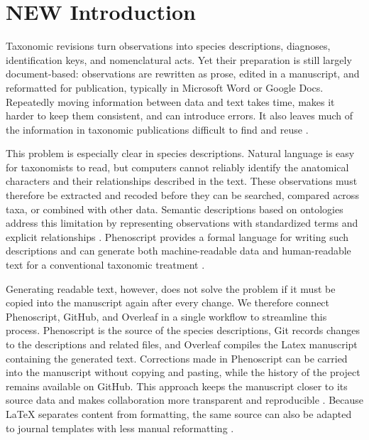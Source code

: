 

\section*{NEW Introduction}

Taxonomic revisions turn observations into species descriptions, diagnoses, identification keys, and nomenclatural acts. Yet their preparation is still largely document-based: observations are rewritten as prose, edited in a manuscript, and reformatted for publication, typically in Microsoft Word or Google Docs. Repeatedly moving information between data and text takes time, makes it harder to keep them consistent, and can introduce errors. It also leaves much of the information in taxonomic publications difficult to find and reuse \citep{smith2013beyond, miller2012cybertaxonomic, penev2017strategies}.

This problem is especially clear in species descriptions. Natural language is easy for taxonomists to read, but computers cannot reliably identify the anatomical characters and their relationships described in the text. These observations must therefore be extracted and recoded before they can be searched, compared across taxa, or combined with other data. Semantic descriptions based on ontologies address this limitation by representing observations with standardized terms and explicit relationships \citep{balhoff2013semantic, deans2015phenotypes}. Phenoscript provides a formal language for writing such descriptions and can generate both machine-readable data and human-readable text for a conventional taxonomic treatment \citep{montanaro2024beyond, montanaro2024computable}.

Generating readable text, however, does not solve the problem if it must be copied into the manuscript again after every change. We therefore connect Phenoscript, GitHub, and Overleaf in a single workflow to streamline this process. Phenoscript is the source of the species descriptions, Git records changes to the descriptions and related files, and Overleaf compiles the Latex manuscript containing the generated text. Corrections made in Phenoscript can be carried into the manuscript without copying and pasting, while the history of the project remains available on GitHub. This approach keeps the manuscript closer to its source data and makes collaboration more transparent and reproducible \citep{ram2013git, braga2023github, himmelstein2020open}. Because \LaTeX{} separates content from formatting, the same source can also be adapted to journal templates with less manual reformatting \citep{bar2021reproducible, krewinkel2017formatting}.

